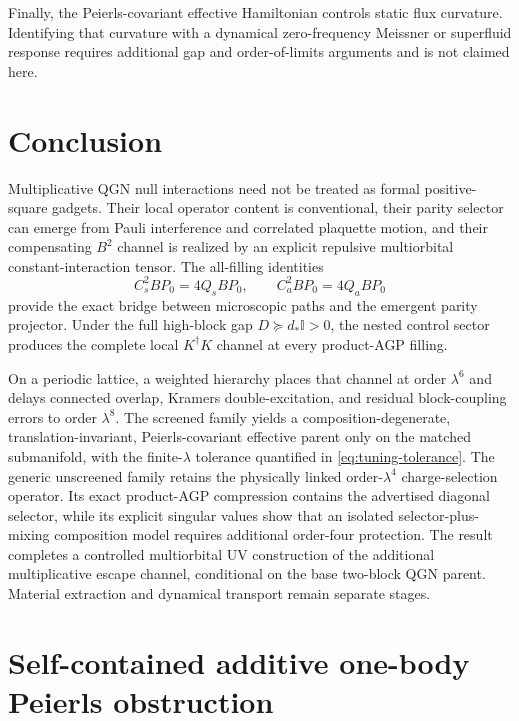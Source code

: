 \documentclass[11pt]{article}
\theoremstyle{definition}
\theoremstyle{remark}
\newcommand{\Id}{\mathbb I}
\begin{document}
Finally, the Peierls-covariant effective Hamiltonian controls static flux curvature.  Identifying that curvature with a dynamical zero-frequency Meissner or superfluid response requires additional gap and order-of-limits arguments and is not claimed here.

\section{Conclusion}

Multiplicative QGN null interactions need not be treated as formal positive-square gadgets.  Their local operator content is conventional, their parity selector can emerge from Pauli interference and correlated plaquette motion, and their compensating $B^2$ channel is realized by an explicit repulsive multiorbital constant-interaction tensor.  The all-filling identities
\begin{equation}
 C_s^2BP_0=4Q_sBP_0,
 \qquad
 C_a^2BP_0=4Q_aBP_0
\end{equation}
provide the exact bridge between microscopic paths and the emergent parity projector.  Under the full high-block gap $D\succeq d_*\Id>0$, the nested control sector produces the complete local $K^\dagger K$ channel at every product-AGP filling.

On a periodic lattice, a weighted hierarchy places that channel at order $\lambda^6$ and delays connected overlap, Kramers double-excitation, and residual block-coupling errors to order $\lambda^8$.  The screened family yields a composition-degenerate, translation-invariant, Peierls-covariant effective parent only on the matched submanifold, with the finite-$\lambda$ tolerance quantified in \eqref{eq:tuning-tolerance}.  The generic unscreened family retains the physically linked order-$\lambda^4$ charge-selection operator.  Its exact product-AGP compression contains the advertised diagonal selector, while its explicit singular values show that an isolated selector-plus-mixing composition model requires additional order-four protection.  The result completes a controlled multiorbital UV construction of the additional multiplicative escape channel, conditional on the base two-block QGN parent.  Material extraction and dynamical transport remain separate stages.


\appendix

\section{Self-contained additive one-body Peierls obstruction}
\label{app:no-go}
\end{document}
